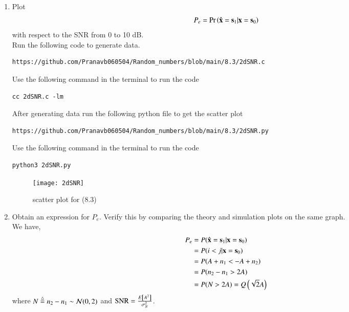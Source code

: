 \documentclass[journal,12pt,twocolumn]{IEEEtran}
\renewcommand\thesection{\arabic{section}}
\begin{document}
\begin{enumerate}[label=\thesection.\arabic*
,ref=\thesection.\theenumi]
\begin{align}
    p(y|s_0) &\dec{s_0}{s_1} p(y|s_1)\\
    \frac{1}{2\pi}e^{-\frac{{(i-A)}^2+j^2}{2}} &\dec{s_0}{s_1} \frac{1}{2\pi}e^{-\frac{i^2+{(j-A)}/^2}{2}}\\
    {(y_1-A)}^2+y_2^2 &\dec{s_0}{s_1} i^2+{(j-A)}^2\\
    -2iA  &\dec{s_0}{s_1} -2jA\\
    i &\dec{s_0}{s_1} j
\end{align}
\begin{align}
	\hat{\vec{x}} = 
	\begin{cases}
		\vec{s}_0 & i > j \\
		\vec{s}_1 & i < j
	\end{cases}
\end{align}
where $\vec{y} = \myvec{i\\ j}$

%
\item
Plot 
\begin{equation} 
P_e = \Pr\left(\hat{\mathbf{x}} = \mathbf{s}_1|\mathbf{x} = \mathbf{s}_0\right)
\end{equation}
with respect to the SNR from 0 to 10 dB.\\
Run the following code to generate data.
\begin{lstlisting}
https://github.com/Pranavb060504/Random_numbers/blob/main/8.3/2dSNR.c
\end{lstlisting}
Use the following command in the terminal to run the code
\begin{lstlisting}
cc 2dSNR.c -lm
\end{lstlisting}
After generating data run the following python file to get the scatter plot
\begin{lstlisting}
https://github.com/Pranavb060504/Random_numbers/blob/main/8.3/2dSNR.py
\end{lstlisting}
Use the following command in the terminal to run the code
\begin{lstlisting}
python3 2dSNR.py
\end{lstlisting}
\begin{figure}[h]
\texttt{[image: 2dSNR]}
\caption{scatter plot for (8.3)}
\label{fig:S2dSNR}
\end{figure}

%
\item
Obtain an expression for $P_e$. Verify this by comparing the theory and simulation plots on the same graph.\\
\solution
We have, 
\begin{align}
	P_e &= P(\hat{\mathbf{x}} = \mathbf{s}_1 | \mathbf{x} = \mathbf{s}_0) \\
		&= P(i < j | \mathbf{x} = \mathbf{s}_0) \\
		&= P(A + n_1 < -A + n_2) \\
		&= P(n_2 - n_1 > 2A) \\
		&= P(N > 2A) = Q\left(\sqrt{2}A\right)
\end{align}
where $N \stackrel{\triangle}{=} n_2 - n_1 \sim \mathcal{N}(0, 2)$ and $\textrm{SNR} = \frac{E{}\left[A^2\right]}{\sigma_N^2}$.

%
		\end{enumerate}
\end{document}
